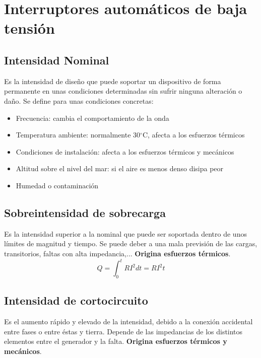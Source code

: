\chapter{Interruptores automáticos de baja tensión}
\section{Intensidad Nominal}
Es la intensidad de diseño que puede soportar un dispositivo de forma permanente en unas condiciones determinadas sin sufrir ninguna alteración o daño.
\newline
Se define para unas condiciones concretas:
\begin{itemize}
	\item Frecuencia: cambia el comportamiento de la onda
	\item Temperatura ambiente: normalmente 30$^\circ$C, afecta a los esfuerzos térmicos
	\item Condiciones de instalación: afecta a los esfuerzos térmicos y mecánicos
	\item Altitud sobre el nivel del mar: si el aire es menos denso disipa peor
	\item Humedad o contaminación
\end{itemize}
\section{Sobreintensidad de sobrecarga}
Es la intensidad superior a la nominal que puede ser soportada dentro de unos límites de magnitud y tiempo. Se puede deber a una mala previsión de las cargas, transitorios, faltas con alta impedancia,...
\textbf{Origina esfuerzos térmicos}.
\begin{equation}
	Q=\int_{0}^{t} RI^2dt=RI^2t
\end{equation}
\section{Intensidad de cortocircuito}
Es el aumento rápido y elevado de la intensidad, debido a la conexión accidental entre fases o entre éstas y tierra. Depende de las impedancias de los distintos elementos entre el generador y la falta. \textbf{Origina esfuerzos térmicos y mecánicos}.
